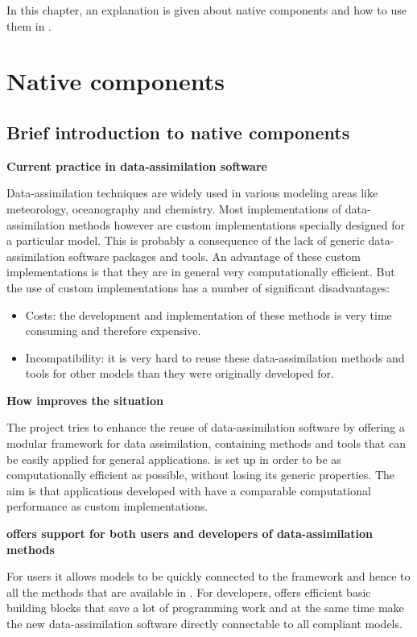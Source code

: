 \label{chap:native}
In this chapter, an explanation is given about native components and how to use them in \oda.
\section{Native components}

\subsection{Brief introduction to \oda native components}
\textbf{Current practice in data-assimilation software}

Data-assimilation techniques are widely used in various modeling areas like meteorology, oceanography and chemistry. Most implementations of data-assimilation methods however are custom implementations specially designed for a particular model. This is probably a consequence of the lack of generic data-assimilation software packages and tools. An advantage of these custom implementations is that they are in general very computationally efficient. But the use of custom implementations has a number of significant disadvantages:

\begin{itemize}
\item Costs: the development and implementation of these methods is very time consuming and therefore expensive.
\item Incompatibility: it is very hard to reuse these data-assimilation methods and tools for other models than they were originally developed for. 
\end{itemize}
    
\textbf{How \oda improves the situation}

The \oda project tries to enhance the reuse of data-assimilation software by offering a modular framework for data assimilation, containing methods and tools that can be easily applied for general applications. \oda is set up in order to be as computationally efficient as possible, without losing its generic properties. The aim is that applications developed with \oda have a comparable computational performance as custom implementations.

\textbf{\oda offers support for both users and developers of data-assimilation methods}

For users it allows models to be quickly connected to the \oda framework and hence to all the methods that are available in \oda. For developers, \oda offers efficient basic building blocks that save a lot of programming work and at the same time make the new data-assimilation software directly connectable to all \oda compliant models.

